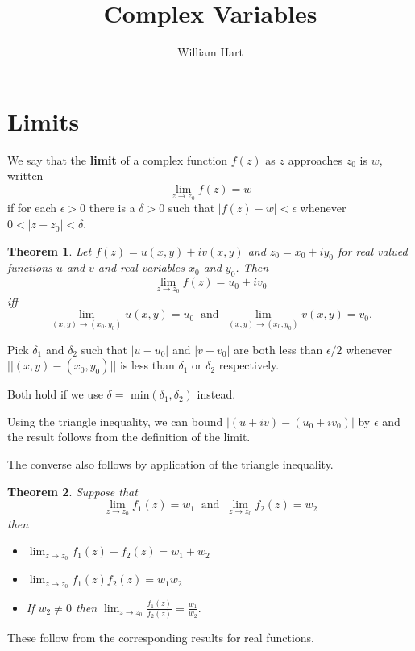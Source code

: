 \documentclass[a4paper,10pt]{article}
\title{Complex Variables}
\author{William Hart}
\newtheorem{theorem}{Theorem}[section]
\newenvironment{definition}[1][Definition]{\begin{trivlist}
\item[\hskip \labelsep {\bfseries #1}]}{\end{trivlist}}
\begin{document}
\maketitle

\section{Limits}

\begin{definition}
We say that the \textbf{limit} of a complex function $f(z)$ as $z$ approaches $z_0$ is $w$, written
$$\lim_{z\to z_0}f(z) = w$$
if for each $\epsilon > 0$ there is a $\delta > 0$ such that $|f(z) - w| < \epsilon$ whenever $0 < |z - z_0| < \delta$. 
\end{definition}

\begin{theorem}
Let $f(z) = u(x, y) + iv(x, y)$ and $z_0 = x_0 + iy_0$ for real valued functions $u$ and $v$ and real variables $x_0$ and $y_0$. Then 
$$\lim_{z \to z_0}f(z) = u_0 + iv_0$$
iff
$$\lim_{(x, y) \to (x_0, y_0)}u(x, y) = u_0 \;\;\mbox{and}\;\; \lim_{(x, y) \to (x_0, y_0)}v(x, y) = v_0.$$
\end{theorem}

Pick $\delta_1$ and $\delta_2$ such that $|u - u_0|$ and $|v - v_0|$ are both less than $\epsilon/2$ whenever $||(x, y) - (x_0, y_0)||$ is less than $\delta_1$ or $\delta_2$ respectively.

Both hold if we use $\delta =$ min$(\delta_1, \delta_2)$ instead.

Using the triangle inequality, we can bound $|(u + iv) - (u_0 + iv_0)|$ by $\epsilon$ and the result follows from the definition of the limit.

The converse also follows by application of the triangle inequality.

\begin{theorem}
Suppose that
$$\lim_{z\to z_0}f_1(z) = w_1 \;\;\mbox{and}\;\; \lim_{z\to z_0}f_2(z) = w_2$$
then
\begin{itemize}
\item $\lim_{z \to z_0}f_1(z) + f_2(z) = w_1 + w_2$
\item $\lim_{z \to z_0}f_1(z)f_2(z) = w_1w_2$
\item If $w_2 \neq 0$ then $\lim_{z \to z_0}\frac{f_1(z)}{f_2(z)} = \frac{w_1}{w_2}.$
\end{itemize}
\end{theorem}

These follow from the corresponding results for real functions.
\end{document}
